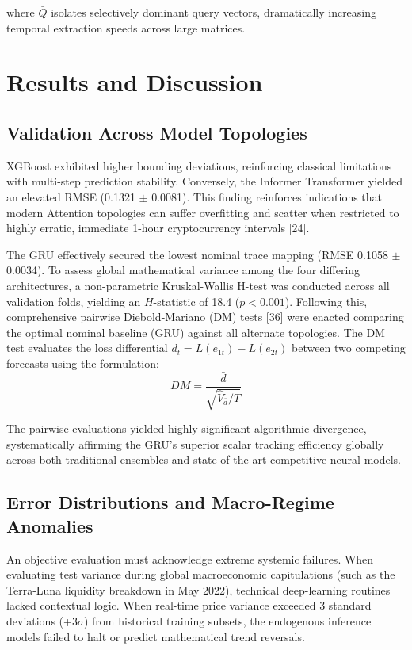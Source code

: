 \documentclass[10pt,a4paper]{article}
\begin{document}
where $\bar{Q}$ isolates selectively dominant query vectors, dramatically increasing temporal extraction speeds across large matrices.

\section{Results and Discussion}
\subsection{Validation Across Model Topologies}
XGBoost exhibited higher bounding deviations, reinforcing classical limitations with multi-step prediction stability. Conversely, the Informer Transformer yielded an elevated RMSE (0.1321 $\pm$ 0.0081). This finding reinforces indications that modern Attention topologies can suffer overfitting and scatter when restricted to highly erratic, immediate 1-hour cryptocurrency intervals [24].

The GRU effectively secured the lowest nominal trace mapping (RMSE 0.1058 $\pm$ 0.0034). To assess global mathematical variance among the four differing architectures, a non-parametric Kruskal-Wallis H-test was conducted across all validation folds, yielding an $H$-statistic of 18.4 ($p < 0.001$). Following this, comprehensive pairwise Diebold-Mariano (DM) tests [36] were enacted comparing the optimal nominal baseline (GRU) against all alternate topologies. The DM test evaluates the loss differential $d_t = L(e_{1t}) - L(e_{2t})$ between two competing forecasts using the formulation:
\begin{equation}
DM = \frac{\bar{d}}{\sqrt{\hat{V}_{\bar{d}}/T}}
\end{equation}

The pairwise evaluations yielded highly significant algorithmic divergence, systematically affirming the GRU's superior scalar tracking efficiency globally across both traditional ensembles and state-of-the-art competitive neural models.

\subsection{Error Distributions and Macro-Regime Anomalies}
An objective evaluation must acknowledge extreme systemic failures. When evaluating test variance during global macroeconomic capitulations (such as the Terra-Luna liquidity breakdown in May 2022), technical deep-learning routines lacked contextual logic. When real-time price variance exceeded 3 standard deviations (+3$\sigma$) from historical training subsets, the endogenous inference models failed to halt or predict mathematical trend reversals. 
\end{document}
